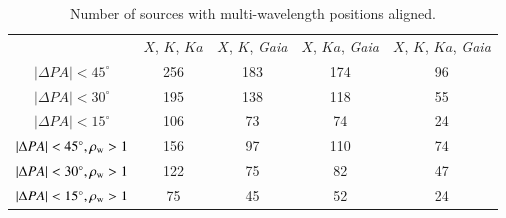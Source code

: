 \documentclass{aa}
\begin{document}
    \begin{table}[htbp]
        \centering
        \caption{\label{tab:no_sou_aligned}
            Number of sources with multi-wavelength positions aligned.
        }
        \begin{tabular}{ccccc}
            \hline \noalign{\smallskip}
            &$X$, $K$, $Ka$ &$X$, $K$, \textit{\it Gaia} &$X$, $Ka$, \textit{\it Gaia} &$X$, $K$, $Ka$, \textit{\it Gaia}\\
            \noalign{\smallskip}
            \hline
            \noalign{\smallskip}
            $|\Delta PA|<45^\circ$       &256  &183  &174  &96\\
            $|\Delta PA|<30^\circ$       &195  &138  &118  &55\\
            $|\Delta PA|<15^\circ$       &106  &73   &74   &24\\
            $|\Delta PA|<45^\circ, \rho_{\rm w}>1$  &156  &97   &110  &74\\
            $|\Delta PA|<30^\circ, \rho_{\rm w}>1$  &122  &75   &82   &47\\
            $|\Delta PA|<15^\circ, \rho_{\rm w}>1$  &75   &45   &52   &24\\
            \hline
        \end{tabular}
    \end{table}
\end{document}
